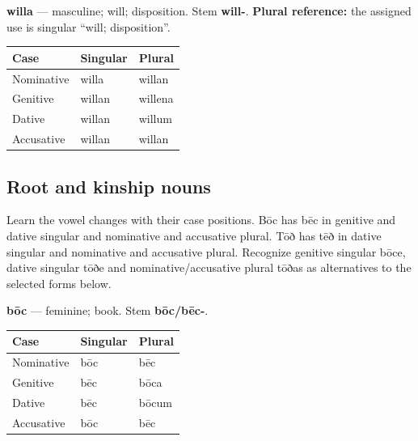 \textbf{willa} — masculine; will; disposition. Stem \textbf{will-}. \textbf{Plural reference:} the assigned use is singular “will; disposition”.

\par\begingroup
\fontsize{10.5}{13.2}\selectfont
\setlength{\LTleft}{0pt}\setlength{\LTright}{\fill}
\noindent
\begin{tabular}{@{}>{\raggedright\arraybackslash}p{39.46mm}>{\raggedright\arraybackslash}p{39.46mm}>{\raggedright\arraybackslash}p{39.46mm}@{}}
\toprule
\textbf{Case} & \textbf{Singular} & \textbf{Plural} \\
\midrule
Nominative & willa & willan \\
Genitive & willan & willena \\
Dative & willan & willum \\
Accusative & willan & willan \\
\bottomrule
\end{tabular}
\par\endgroup

\subsection*{Root and kinship nouns}

Learn the vowel changes with their case positions. Bōc has bēc in genitive and dative singular and nominative and accusative plural. Tōð has tēð in dative singular and nominative and accusative plural. Recognize genitive singular bōce, dative singular tōðe and nominative/\allowbreak{}accusative plural tōðas as alternatives to the selected forms below.

\textbf{bōc} — feminine; book. Stem \textbf{bōc/\allowbreak{}bēc-}.

\par\begingroup
\fontsize{10.5}{13.2}\selectfont
\setlength{\LTleft}{0pt}\setlength{\LTright}{\fill}
\noindent
\begin{tabular}{@{}>{\raggedright\arraybackslash}p{39.46mm}>{\raggedright\arraybackslash}p{39.46mm}>{\raggedright\arraybackslash}p{39.46mm}@{}}
\toprule
\textbf{Case} & \textbf{Singular} & \textbf{Plural} \\
\midrule
Nominative & bōc & bēc \\
Genitive & bēc & bōca \\
Dative & bēc & bōcum \\
Accusative & bōc & bēc \\
\bottomrule
\end{tabular}
\par\endgroup

